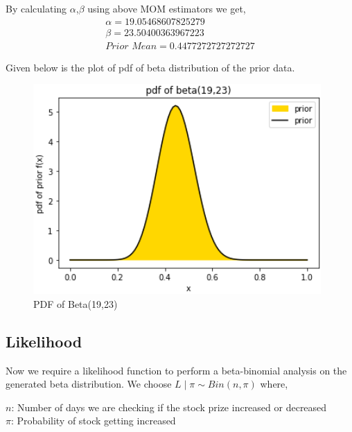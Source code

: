 \documentclass[conference]{IEEEtran}
\begin{document}
        By calculating $\alpha$,$\beta$ using above MOM estimators we get,
        \begin{align*}
            \alpha = 19.05468607825279\\
            \beta =  23.50400363967223 \\ 
            \textit{Prior Mean} = 0.4477272727272727
        \end{align*}
        
        \par Given below is the plot of pdf of beta distribution of the prior data.
    
        \begin{figure}[htbp]
            \begin{center}
                \centerline{\includegraphics[scale=1]{Images/Pdf_beta_prior.png}}
                \caption{PDF of Beta(19,23)}
            \end{center}
        \end{figure}
        
    \subsection{Likelihood}
        Now we require a likelihood function to perform a beta-binomial analysis on the generated beta distribution. We choose $L \mid \pi \sim Bin(n,\pi)$ where,
        \begin{center}
            $n$: Number of days we are checking if the stock prize increased or decreased \\
            $\pi$: Probability of stock getting increased
        \end{center}
        
\end{document}

